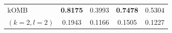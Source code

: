\begin{tabular}{lcccc}


kOMB
& \textbf{0.8175} & 0.3993 & \textbf{0.7478} & 0.5304 \\
{\scriptsize $(k=2,l=2)$}& {\scriptsize 0.1943} & {\scriptsize 0.1166} & {\scriptsize 0.1505} & {\scriptsize 0.1227} \\
\bottomrule
\end{tabular}
